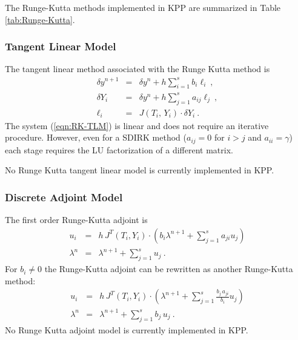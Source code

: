 \documentclass[twoside]{article}
\begin{document}
The Runge-Kutta methods implemented in KPP are summarized in Table
\ref{tab:Runge-Kutta}.

\subsubsection{Tangent Linear Model}

The tangent linear method associated with the Runge Kutta method is
%
\begin{eqnarray}
\label{eqn:RK-TLM}
\delta y^{n+1} &=& \delta y^n + h \sum_{i=1}^s b_i \ell_i~,\\
\nonumber
\delta Y_i& =& \delta y^n + h \sum_{j=1}^{s} a_{ij} \ell_j~,\\
\nonumber
\ell_i &=& J\left(T_i, \, Y_i \right) \cdot \delta Y_i ~.
\end{eqnarray}
%
The system (\ref{eqn:RK-TLM}) is linear and does not require an iterative
procedure. However, even for a SDIRK method  ($a_{ij}=0$ for $i>j$ and
$a_{ii}=\gamma$) each stage requires the LU factorization of a different
matrix.

No Runge Kutta tangent linear model is currently implemented in KPP.

\subsubsection{Discrete Adjoint Model}

The first order Runge-Kutta adjoint is
%
\begin{eqnarray}
\label{RK-adj}
u_i &=& h \, J^T(T_i,Y_i)\cdot
\left( b_i \lambda^{n+1} + \sum_{j=1}^s a_{ji} u_j \right)\\ %
\nonumber
\lambda^{n} &=& \lambda^{n+1} +\sum_{j=1}^s u_j~.
\end{eqnarray}
%
For $b_i \ne 0 $ the Runge-Kutta adjoint can be
rewritten as another Runge-Kutta method:
%
\begin{eqnarray}
\label{RK-adj-2}
u_i &=& h \, J^T(T_i,Y_i)\cdot
\left( \lambda^{n+1} + \sum_{j=1}^s \frac{b_j \,
a_{ji}}{b_i} u_j \right)\\ %
\nonumber
\lambda^{n} &=& \lambda^{n+1} +\sum_{j=1}^s b_j \, u_j~.
\end{eqnarray}
%
No Runge Kutta adjoint model is currently implemented in KPP.
\end{document}
